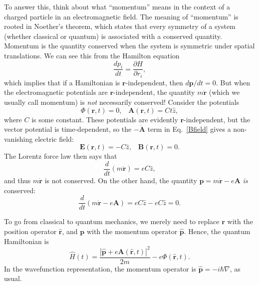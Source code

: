 \documentclass[pra,12pt]{revtex4}
\begin{document}
To answer this, think about what ``momentum'' means in the context of
a charged particle in an electromagnetic field.  The meaning of
``momentum'' is rooted in Noether's theorem, which states that every
symmetry of a system (whether classical or quantum) is associated with
a conserved quantity.  Momentum is the quantity conserved when the
system is symmetric under spatial translations.  We can see this from
the Hamilton equation
\begin{equation*}
  \frac{dp_i}{dt} = \frac{\partial H}{\partial r_i},
\end{equation*}
which implies that if a Hamiltonian is $\mathbf{r}$-independent, then
$d\mathbf{p}/dt = 0$.  But when the electromagnetic potentials are
$\mathbf{r}$-independent, the quantity $m\dot{\mathbf{r}}$ (which we
usually call momentum) is \textit{not} necessarily conserved!
Consider the potentials
\begin{equation}
  \Phi(\mathbf{r}, t) = 0, \;\;\; \mathbf{A}(\mathbf{r}, t) = Ct \hat{z},
\end{equation}
where $C$ is some constant.  These potentials are evidently
$\mathbf{r}$-independent, but the vector potential is time-dependent,
so the $-\dot{\mathbf{A}}$ term in Eq.~\eqref{Bfield} gives a
non-vanishing electric field:
\begin{equation}
  \mathbf{E}(\mathbf{r},t) = - C\hat{z}, \;\;\;\mathbf{B}(\mathbf{r},t) = 0.
\end{equation}
The Lorentz force law then says that
\begin{equation}
  \frac{d}{dt}(m\dot{\mathbf{r}}) = eC\hat{z},
\end{equation}
and thus $m\dot{\mathbf{r}}$ is not conserved.  On the other hand, the
quantity $\mathbf{p} = m\dot{\mathbf{r}} - e \mathbf{A}$ \textit{is}
conserved:
\begin{equation}
  \frac{d}{dt}(m\dot{\mathbf{r}} - e\mathbf{A}) =
  eC\hat{z} - eC\hat{z} = 0.
\end{equation}

To go from classical to quantum mechanics, we merely need to replace
$\mathbf{r}$ with the position operator $\hat{\mathbf{r}}$, and
$\mathbf{p}$ with the momentum operator $\hat{\mathbf{p}}$.  Hence,
the quantum Hamiltonian is
\begin{equation}
  \hat{H}(t) = \frac{|\hat{\mathbf{p}}+e\mathbf{A}(\hat{\mathbf{r}},t)|^2}{2m}
  - e\Phi(\hat{\mathbf{r}},t).
  \label{quantumH}
\end{equation}
In the wavefunction representation, the momentum operator is
$\hat{\mathbf{p}} = -i\hbar\nabla$, as usual.
\end{document}
